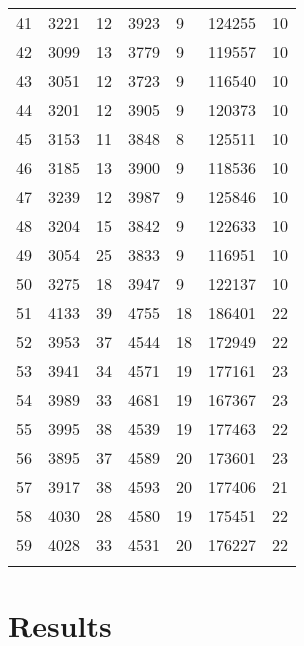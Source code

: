 \documentclass[paper=a4, fontsize=11pt]{scrartcl}
\numberwithin{equation}{section}
\numberwithin{figure}{section}
\numberwithin{table}{section}
\begin{document}
{{\begin{tabular}{l || l | l | l | l | l | l }
    41  &  3221   &  12      & 3923   &   9      & 124255    & 10      \\
    42  &  3099   &  13      & 3779   &   9      & 119557    & 10      \\
    43  &  3051   &  12      & 3723   &   9      & 116540    & 10      \\
    44  &  3201   &  12      & 3905   &   9      & 120373    & 10      \\
    45  &  3153   &  11      & 3848   &   8      & 125511    & 10      \\
    46  &  3185   &  13      & 3900   &   9      & 118536    & 10      \\
    47  &  3239   &  12      & 3987   &   9      & 125846    & 10      \\
    48  &  3204   &  15      & 3842   &   9      & 122633    & 10      \\
    49  &  3054   &  25      & 3833   &   9      & 116951    & 10      \\
    50  &  3275   &  18      & 3947   &   9      & 122137    & 10      \\
    51  &  4133   &  39      & 4755   &   18     & 186401    & 22      \\
    52  &  3953   &  37      & 4544   &   18     & 172949    & 22      \\
    53  &  3941   &  34      & 4571   &   19     & 177161    & 23      \\
    54  &  3989   &  33      & 4681   &   19     & 167367    & 23      \\
    55  &  3995   &  38      & 4539   &   19     & 177463    & 22      \\
    56  &  3895   &  37      & 4589   &   20     & 173601    & 23      \\
    57  &  3917   &  38      & 4593   &   20     & 177406    & 21      \\
    58  &  4030   &  28      & 4580   &   19     & 175451    & 22      \\
    59  &  4028   &  33      & 4531   &   20     & 176227    & 22      \\

	\hline \\

\end{tabular}
}
}

\section{Results}
\end{document}

